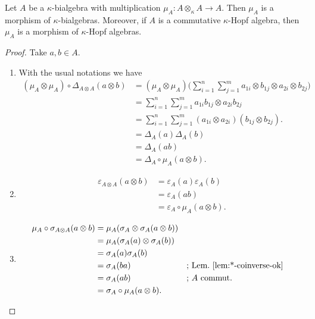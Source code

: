 \begin{prop}
    Let $A$ be a $\kappa$-bialgebra with multiplication $\mu_A\colon A\otimes_\kappa A\to A$. Then $\mu_A$ is a morphism of $\kappa$-bialgebras. Moreover, if $A$ is a commutative $\kappa$-Hopf algebra, then $\mu_A$ is a morphism of $\kappa$-Hopf algebras.
\end{prop}

\begin{proof} Take $a,b\in A$.
    \begin{enumerate}[\rm i)]
        \item With the usual notations we have
        \begin{align*}
            (\mu_A\otimes\mu_A)
                    \circ\Delta_{A\otimes A}(a\otimes b)
                &= (\mu_A\otimes\mu_A)\Big(\sum_{i=1}^n\sum_{j=1}^m
                    a_{1i}\otimes b_{1j}\otimes a_{2i}\otimes b_{2j}\Big)
                        \\[-0.1in]
                &= \sum_{i=1}^n\sum_{j=1}^m
                    a_{1i}b_{1j}\otimes a_{2i}b_{2j}\\
                &= \sum_{i=1}^n\sum_{j=1}^m
                    (a_{1i}\otimes a_{2i})(b_{1j}\otimes b_{2j}).\\
                &= \Delta_A(a)\Delta_A(b)\\
                &= \Delta_A(ab)\\
                &= \Delta_A\circ\mu_A(a\otimes b).
        \end{align*}
        \normalsize

        \item 
        \begin{align*}
            \varepsilon_{A\otimes A}(a\otimes b)
                &= \varepsilon_A(a)\varepsilon_A(b)\\
                &= \varepsilon_A(ab)\\
                &= \varepsilon_A\circ\mu_A(a\otimes b).
        \end{align*}
        \normalsize

        \item
        \begin{align*}
            \mu_A\circ\sigma_{A\otimes A}(a\otimes b)
                &= \mu_A(\sigma_A\otimes\sigma_A(a\otimes b))\\
                &= \mu_A(\sigma_A(a)\otimes\sigma_A(b))\\
                &= \sigma_A(a)\sigma_A(b)\\
                &= \sigma_A(ba)
                    &&\text{; Lem.~\ref{lem:*-coinverse-ok}}\\
                &= \sigma_A(ab)
                    &&\text{; $A$ commut.}\\
                &= \sigma_A\circ\mu_A(a\otimes b).
        \end{align*}
        \normalsize
    \end{enumerate}
\end{proof}

